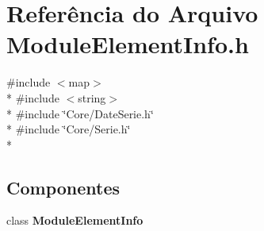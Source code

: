 \section{Referência do Arquivo Module\+Element\+Info.\+h}
\label{_module_element_info_8h}
{\ttfamily \#include $<$map$>$}\\*
{\ttfamily \#include $<$string$>$}\\*
{\ttfamily \#include \char`\"{}Core/\+Date\+Serie.\+h\char`\"{}}\\*
{\ttfamily \#include \char`\"{}Core/\+Serie.\+h\char`\"{}}\\*
\subsection*{Componentes}
\begin{DoxyCompactItemize}
\item 
class {\bf Module\+Element\+Info}
\end{DoxyCompactItemize}
